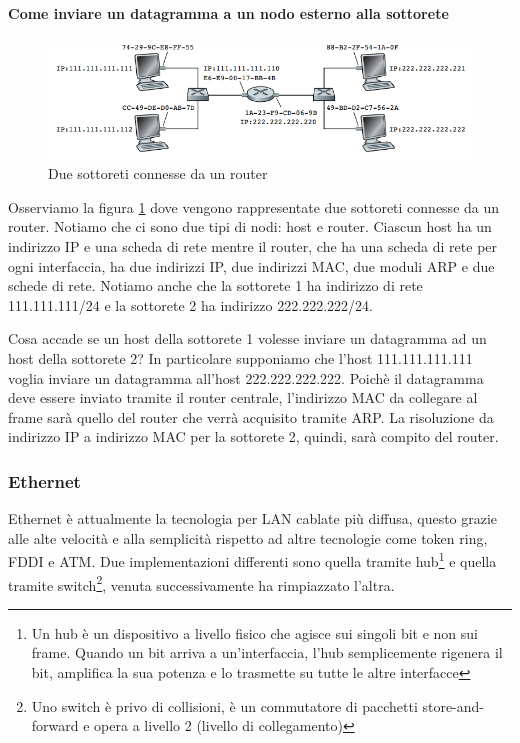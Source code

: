 \documentclass[11pt,a4paper]{article}
\begin{document}
\paragraph{Come inviare un datagramma a un nodo esterno alla sottorete}
\begin{figure}
	\includegraphics[scale=0.5]{img/085.png}
	\caption{Due sottoreti connesse da un router}
	\label{fig: 085}
\end{figure}
Osserviamo la figura \ref{fig: 085} dove vengono rappresentate due sottoreti connesse da un router. Notiamo che ci sono due tipi di nodi: host e router. Ciascun host ha un indirizzo IP e una scheda di rete mentre il router, che ha una scheda di rete per ogni interfaccia, ha due indirizzi IP, due indirizzi MAC, due moduli ARP e due schede di rete. Notiamo anche che la sottorete 1 ha indirizzo di rete 111.111.111/24 e la sottorete 2 ha indirizzo 222.222.222/24.

Cosa accade se un host della sottorete 1 volesse inviare un datagramma ad un host della sottorete 2? In particolare supponiamo che l'host 111.111.111.111 voglia inviare un datagramma all'host 222.222.222.222. Poichè il datagramma deve essere inviato tramite il router centrale, l'indirizzo MAC da collegare al frame sarà quello del router che verrà acquisito tramite ARP. La risoluzione da indirizzo IP a indirizzo MAC per la sottorete 2, quindi, sarà compito del router.

\subsubsection{Ethernet}
Ethernet è attualmente la tecnologia per LAN cablate più diffusa, questo grazie alle alte velocità e alla semplicità rispetto ad altre tecnologie come token ring, FDDI e ATM. Due implementazioni differenti sono quella tramite hub\footnote{Un hub è un dispositivo a livello fisico che agisce sui singoli bit e non sui frame. Quando un bit arriva a un'interfaccia, l'hub semplicemente rigenera il bit, amplifica la sua potenza e lo trasmette su tutte le altre interfacce} e quella tramite switch\footnote{Uno switch è privo di collisioni, è un commutatore di pacchetti store-and-forward e opera a livello 2 (livello di collegamento)}, venuta successivamente ha rimpiazzato l'altra.
\end{document}

